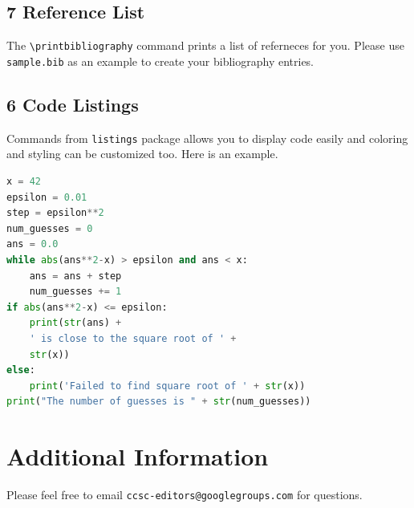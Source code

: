 \documentclass[10pt]{article}
\begin{document}
\subsection*{7 Reference List}
The \verb+\printbibliography+ command prints a list of referneces for you. Please use \texttt{sample.bib} as an example to create your bibliography entries.

\subsection*{6 Code Listings}
Commands from \texttt{listings} package allows you to display code easily and coloring and styling can be customized too. Here is an example.

\begin{lstlisting}[language=Python,  caption=Python example]
x = 42
epsilon = 0.01
step = epsilon**2
num_guesses = 0
ans = 0.0
while abs(ans**2-x) > epsilon and ans < x:
    ans = ans + step
    num_guesses += 1
if abs(ans**2-x) <= epsilon:
    print(str(ans) +
    ' is close to the square root of ' +
    str(x))
else:
    print('Failed to find square root of ' + str(x))
print("The number of guesses is " + str(num_guesses))
\end{lstlisting}

\section*{Additional Information}
Please feel free to email \verb+ccsc-editors@googlegroups.com+ for questions.

\medskip

\printbibliography
\end{document}
